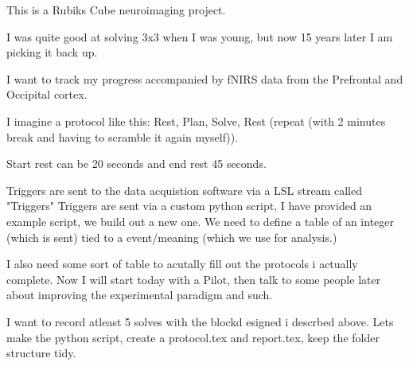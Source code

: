 

This is a Rubiks Cube neuroimaging project.

I was quite good at solving 3x3 when I was young, but now 15 years later I am
picking it back up. 

I want to track my progress accompanied by fNIRS data from the Prefrontal and
Occipital cortex.

I imagine a protocol like this: Rest, Plan, Solve, Rest (repeat (with 2 minutes
break and having to scramble it again myself)).


Start rest can be 20 seconds and end rest 45 seconds.

Triggers are sent to the data acquistion software via a LSL stream called "Triggers"
Triggers are sent via a custom python script, I have provided an example script,
we build out a new one. 
We need to define a table of an integer (which is sent) tied to a event/meaning
(which we use for analysis.)

I also need some sort of table to acutally fill out the protocols i actually complete.
Now I will start today with a Pilot, then talk to some people later about
improving the experimental paradigm and such. 

I want to record atleast 5 solves with the blockd esigned i descrbed above. Lets
make the python script, create a protocol.tex and report.tex, keep the folder
structure tidy.

